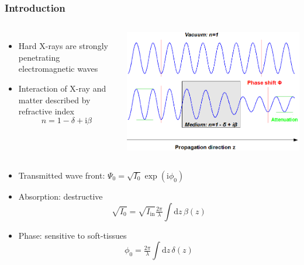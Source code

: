\documentclass{beamer}
\newcommand{\ii}{\mathrm{i}}
\newcommand{\Intd}[1]{\!\mathrm{d}#1\,}
\newcommand{\expp}[1]{\exp\left(#1\right)}
\begin{document}
\begin{frame} 
  \frametitle{Introduction}
  \begin{columns}
    \begin{itemize}
    \item Hard X-rays are strongly penetrating electromagnetic waves
    \item Interaction of X-ray and matter described by refractive index
    \begin{equation*}
      n = 1 - \delta + \ii \beta
    \end{equation*} 
  \end{itemize}
  \includegraphics[width=\textwidth]{figures/interaction}
  \end{columns}
  \begin{itemize}
  \item  Transmitted wave front:   $\Psi_0=\sqrt{I_0}\expp{\ii\phi_0}$ 
   \item Absorption: destructive 
     \begin{equation*}
       \sqrt{I_0}=\sqrt{I_{\mathrm{in}}}\tfrac{2\pi}{\lambda}\int\Intd{z}\beta(z)
     \end{equation*}
   \item Phase: sensitive to soft-tissues
     \begin{equation*}
       \phi_0=\tfrac{2\pi}{\lambda}\int\Intd{z}\delta(z)
     \end{equation*}
   \end{itemize}
 \end{frame}
\end{document}
